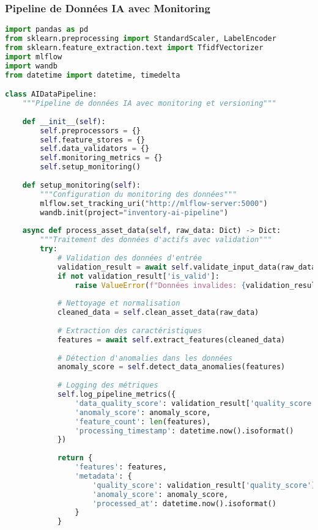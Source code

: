 \documentclass[12pt,a4paper]{report}
\begin{document}
\subsubsection{Pipeline de Données IA avec Monitoring}

\begin{lstlisting}[language=Python, caption=Pipeline de données IA avec monitoring avancé]
import pandas as pd
from sklearn.preprocessing import StandardScaler, LabelEncoder
from sklearn.feature_extraction.text import TfidfVectorizer
import mlflow
import wandb
from datetime import datetime, timedelta

class AIDataPipeline:
    """Pipeline de données IA avec monitoring et versioning"""
    
    def __init__(self):
        self.preprocessors = {}
        self.feature_stores = {}
        self.data_validators = {}
        self.monitoring_metrics = {}
        self.setup_monitoring()
    
    def setup_monitoring(self):
        """Configuration du monitoring des données"""
        mlflow.set_tracking_uri("http://mlflow-server:5000")
        wandb.init(project="inventory-ai-pipeline")
    
    async def process_asset_data(self, raw_data: Dict) -> Dict:
        """Traitement des données d'actifs avec validation"""
        try:
            # Validation des données d'entrée
            validation_result = await self.validate_input_data(raw_data)
            if not validation_result['is_valid']:
                raise ValueError(f"Données invalides: {validation_result['errors']}")
            
            # Nettoyage et normalisation
            cleaned_data = self.clean_asset_data(raw_data)
            
            # Extraction des caractéristiques
            features = await self.extract_features(cleaned_data)
            
            # Détection d'anomalies dans les données
            anomaly_score = self.detect_data_anomalies(features)
            
            # Logging des métriques
            self.log_pipeline_metrics({
                'data_quality_score': validation_result['quality_score'],
                'anomaly_score': anomaly_score,
                'feature_count': len(features),
                'processing_timestamp': datetime.now().isoformat()
            })
            
            return {
                'features': features,
                'metadata': {
                    'quality_score': validation_result['quality_score'],
                    'anomaly_score': anomaly_score,
                    'processed_at': datetime.now().isoformat()
                }
            }
            

\end{lstlisting}
\end{document}
